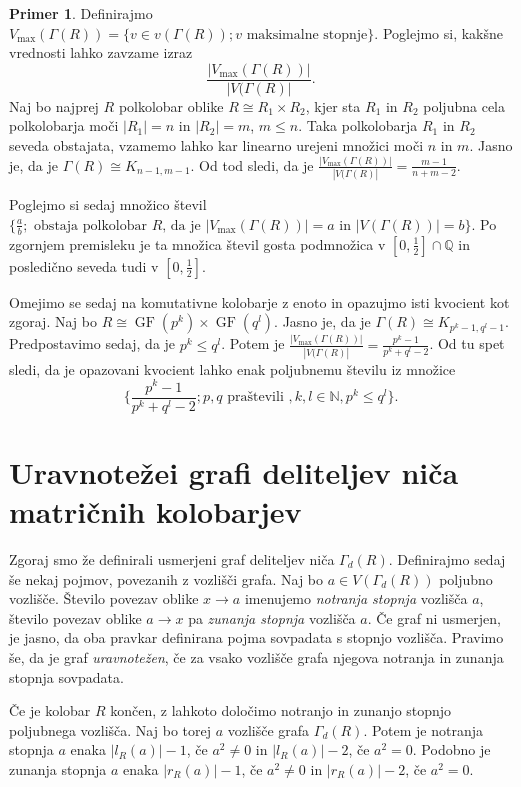 \documentclass[a4paper, 12pt]{amsart}
\theoremstyle{definition} %
\newtheorem{primer}[definicija]{Primer}
\theoremstyle{plain} %
\newcommand{\N}{\mathbb N}
\newcommand{\Q}{\mathbb Q}
\DeclareMathOperator{\GF}{GF}
\begin{document}
\begin{primer}
Definirajmo $V_{\max} (\Gamma(R)) = \{v\in v(\Gamma(R)); v \textrm{ maksimalne stopnje}\}$. Poglejmo si, kakšne vrednosti lahko zavzame izraz 
$$
\frac{|V_{\max}(\Gamma(R))|}{|V(\Gamma(R)|}.
$$
Naj bo najprej $R$ polkolobar oblike $R \cong R_1 \times R_2$, kjer sta $R_1$ in $R_2$ poljubna cela polkolobarja moči $|R_1| = n$ in $|R_2| = m$, $m \le n$. Taka polkolobarja $R_1$ in $R_2$ seveda obstajata, vzamemo lahko kar linearno urejeni množici moči $n$ in $m$. Jasno je, da je $\Gamma(R) \cong K_{n-1,m-1}$. Od tod sledi, da je $\frac{|V_{\max}(\Gamma(R))|}{|V(\Gamma(R)|} = \frac{m-1}{n+m-2}$. 

Poglejmo si sedaj množico števil $\{\frac{a}{b}; \textrm{ obstaja polkolobar } R \textrm{, da je } |V_{\max}(\Gamma(R))| = a \textrm{ in } |V(\Gamma(R))| = b \}$. Po zgornjem premisleku je ta množica števil gosta podmnožica v $[0, \frac{1}{2}]\cap\Q$ in posledično seveda tudi v $[0,\frac{1}{2}]$.

Omejimo se sedaj na komutativne kolobarje z enoto in opazujmo isti kvocient kot zgoraj. Naj bo $R\cong \GF(p^k) \times \GF(q^l)$. Jasno je, da je $\Gamma(R) \cong K_{p^k - 1, q^l -1}$. Predpostavimo sedaj, da je $p^k \le q^l$. Potem je $\frac{|V_{\max}(\Gamma(R))|}{|V(\Gamma(R)|} = \frac{p^k - 1}{p^k + q^l -2}$. Od tu spet sledi, da je opazovani kvocient lahko enak poljubnemu številu iz množice
$$
\Big\{\frac{p^k - 1}{p^k + q^l -2}; p,q \textrm{ praštevili }, k,l \in \N, p^k \le q^l\Big\}.
$$
\end{primer}

\section{Uravnotežei grafi deliteljev niča matričnih kolobarjev}

Zgoraj smo že definirali usmerjeni graf deliteljev niča $\Gamma_d(R)$. Definirajmo sedaj še nekaj pojmov, povezanih z vozlišči grafa. Naj bo $a\in V(\Gamma_d(R))$ poljubno vozlišče. Število povezav oblike $x\rightarrow a$ imenujemo \emph{notranja stopnja} vozlišča $a$, število povezav oblike $a\rightarrow x$ pa \emph{zunanja stopnja} vozlišča $a$. Če graf ni usmerjen, je jasno, da oba pravkar definirana pojma sovpadata s stopnjo vozlišča. Pravimo še, da je graf \emph{uravnotežen}, če za vsako vozlišče grafa njegova notranja in zunanja stopnja sovpadata.

Če je kolobar $R$ končen, z lahkoto določimo notranjo in zunanjo stopnjo poljubnega vozlišča. Naj bo torej $a$ vozlišče grafa $\Gamma_d(R)$. Potem je notranja stopnja $a$ enaka $|l_R(a)|-1$, če $a^2 \neq 0$ in $|l_R(a)|-2$, če $a^2 = 0$. Podobno je zunanja stopnja $a$ enaka $|r_R(a)|-1$, če $a^2 \neq 0$ in $|r_R(a)| - 2$, če $a^2 = 0$.
\end{document}
